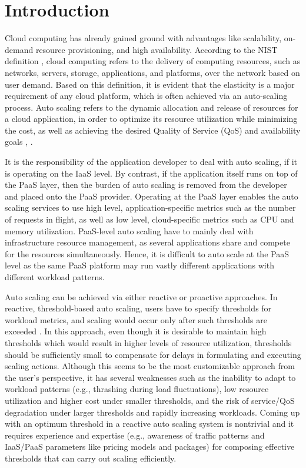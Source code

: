 \section{Introduction}
Cloud computing has already gained ground with advantages like scalability, on-demand resource provisioning, and high availability. According to the NIST definition \cite{Mell_2011}, cloud computing refers to the delivery of computing resources, such as networks, servers, storage, applications, and platforms, over the network based on user demand. Based on this definition, it is evident that the elasticity is a major requirement of any cloud platform, which is often achieved via an auto-scaling process. Auto scaling refers to the dynamic allocation and release of resources for a cloud application, in order to optimize its resource utilization while minimizing the cost, as well as achieving the desired Quality of Service (QoS) and availability goals \cite{Armbrust_2010}, \cite{Roy_2011}.

It is the responsibility of the application developer to deal with auto scaling, if it is operating on the IaaS level. By contrast, if the application itself runs on top of the PaaS layer, then the burden of auto scaling is removed from the developer and placed onto the PaaS provider. Operating at the PaaS layer enables the auto scaling services to use high level, application-specific metrics such as the number of requests in flight, as well as low level, cloud-specific metrics such as CPU and memory utilization. PaaS-level auto scaling have to mainly deal with infrastructure resource management, as several applications share and compete for the resources simultaneously. Hence, it is difficult to auto scale at the PaaS level as the same PaaS platform may run vastly different applications with different workload patterns.

Auto scaling can be achieved via either reactive or proactive approaches. In reactive, threshold-based auto scaling, users have to specify thresholds for workload metrics, and scaling would occur only after such thresholds are exceeded \cite{Lorido_Botran_2014}. In this approach, even though it is desirable to maintain high thresholds which would result in higher levels of resource utilization, thresholds should be sufficiently small to compensate for delays in formulating and executing scaling actions. Although this seems to be the most customizable approach from the user’s perspective, it has several weaknesses \cite{Alipour_2014} such as the inability to adapt to workload patterns (e.g., thrashing during load fluctuations), low resource utilization and higher cost under smaller thresholds, and the risk of service/QoS degradation under larger thresholds and rapidly increasing workloads. Coming up with an optimum threshold in a reactive auto scaling system is nontrivial and it requires experience and expertise (e.g., awareness of traffic patterns and IaaS/PaaS parameters like pricing models and packages) for composing effective thresholds that can carry out scaling efficiently.

